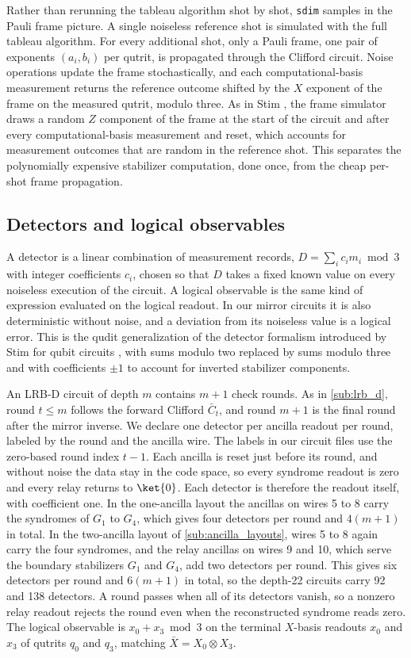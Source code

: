 Rather than rerunning the tableau algorithm shot by shot, \texttt{sdim} samples in the Pauli frame picture. A single noiseless reference shot is simulated with the full tableau algorithm. For every additional shot, only a Pauli frame, one pair of exponents $(a_i, b_i)$ per qutrit, is propagated through the Clifford circuit. Noise operations update the frame stochastically, and each computational-basis measurement returns the reference outcome shifted by the $X$ exponent of the frame on the measured qutrit, modulo three. As in Stim \cite{Gidney2021Stim}, the frame simulator draws a random $Z$ component of the frame at the start of the circuit and after every computational-basis measurement and reset, which accounts for measurement outcomes that are random in the reference shot. This separates the polynomially expensive stabilizer computation, done once, from the cheap per-shot frame propagation.

\subsection{Detectors and logical observables}

A detector is a linear combination of measurement records, $D = \sum_i c_i m_i \bmod 3$ with integer coefficients $c_i$, chosen so that $D$ takes a fixed known value on every noiseless execution of the circuit. A logical observable is the same kind of expression evaluated on the logical readout. In our mirror circuits it is also deterministic without noise, and a deviation from its noiseless value is a logical error. This is the qudit generalization of the detector formalism introduced by Stim for qubit circuits \cite{Gidney2021Stim}, with sums modulo two replaced by sums modulo three and with coefficients $\pm 1$ to account for inverted stabilizer components.

An LRB-D circuit of depth $m$ contains $m+1$ check rounds. As in \autoref{sub:lrb_d}, round $t \le m$ follows the forward Clifford $\bar C_t$, and round $m+1$ is the final round after the mirror inverse. We declare one detector per ancilla readout per round, labeled by the round and the ancilla wire. The labels in our circuit files use the zero-based round index $t - 1$. Each ancilla is reset just before its round, and without noise the data stay in the code space, so every syndrome readout is zero and every relay returns to $\ket{0}$. Each detector is therefore the readout itself, with coefficient one. In the one-ancilla layout the ancillas on wires 5 to 8 carry the syndromes of $G_1$ to $G_4$, which gives four detectors per round and $4(m+1)$ in total. In the two-ancilla layout of \autoref{sub:ancilla_layouts}, wires 5 to 8 again carry the four syndromes, and the relay ancillas on wires 9 and 10, which serve the boundary stabilizers $G_1$ and $G_4$, add two detectors per round. This gives six detectors per round and $6(m+1)$ in total, so the depth-22 circuits carry 92 and 138 detectors. A round passes when all of its detectors vanish, so a nonzero relay readout rejects the round even when the reconstructed syndrome reads zero. The logical observable is $x_0 + x_3 \bmod 3$ on the terminal $X$-basis readouts $x_0$ and $x_3$ of qutrits $q_0$ and $q_3$, matching $\bar{X} = X_0 \otimes X_3$.

